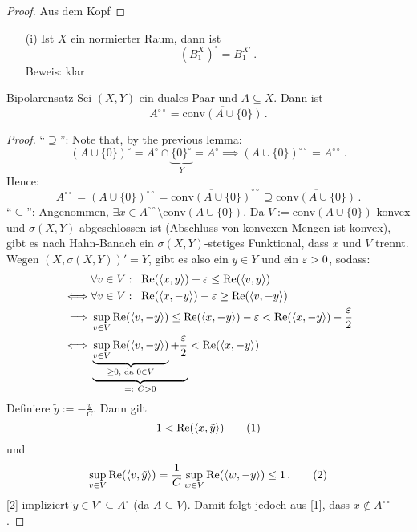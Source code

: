 \documentclass{article}
\begin{document}
	\begin{proof}
		Aus dem Kopf
	\end{proof}
	
		\begin{Beispiel}{}{}
		\begin{itemize}
			\item[(i)] Ist $X$ ein normierter Raum, dann ist
			\[(B_1^X)^{\circ}=B_1^{X'}\,.\]
			Beweis: klar
		\end{itemize}
	\end{Beispiel}
	
	
	
	\begin{Satz}{Bipolarensatz}{}
		Sei $(X,Y)$ ein duales Paar und $A\subseteq X$. Dann ist 
		\[A^{\circ\circ}=\overline{\mathrm{conv}(A\cup \{0\})}\,.\]
	\end{Satz}
	
	\begin{proof}
		\enquote{$\supseteq$}: Note that, by the previous lemma:
		\[(A\cup\{0\})^{\circ}=A^{\circ}\cap\underbrace{\{0\}^{\circ}}_{Y}=A^{\circ}\implies (A\cup\{0\})^{\circ\circ}=A^{\circ\circ}\,.\]
		Hence:
		\[A^{\circ\circ}=(A\cup \{0\})^{\circ\circ}=\overline{\mathrm{conv}(A\cup \{0\})}^{\circ\circ}\supseteq \overline{\mathrm{conv}(A\cup \{0\})}\,.\]
		\enquote{$\subseteq$}: Angenommen, $\exists x\in A^{\circ\circ}\setminus\overline{\mathrm{conv}(A\cup \{0\})}$. Da $V:=\overline{\mathrm{conv}(A\cup \{0\})}$ konvex und $\sigma(X,Y)$-abgeschlossen ist (Abschluss von konvexen Mengen ist konvex), gibt es nach Hahn-Banach ein $\sigma(X,Y)$-stetiges Funktional, dass $x$ und $V$ trennt. Wegen $(X,\sigma(X,Y))'=Y$, gibt es also ein $y\in Y$ und ein $\operatorname{\varepsilon}>0$, sodass:
         \begin{align*}
         &\forall v\in V:\;\; \operatorname{\textrm{Re}}(\left\langle x,y\right\rangle)+\operatorname{\varepsilon}\le \operatorname{\textrm{Re}}(\left\langle v,y\right\rangle)\\
         \iff& \forall v\in V:\;\;\operatorname{\textrm{Re}}(\left\langle x,-y\right\rangle)-\operatorname{\varepsilon}\ge \operatorname{\textrm{Re}}(\left\langle v,-y\right\rangle)\\
         \implies& \sup_{v\in V}\operatorname{\textrm{Re}}(\left\langle v,-y\right\rangle)\le \operatorname{\textrm{Re}}(\left\langle x,-y\right\rangle)-\operatorname{\varepsilon}<\operatorname{\textrm{Re}}(\left\langle x,-y\right\rangle)-\frac{\operatorname{\varepsilon}}{2} \\
         \iff& \underbrace{\underbrace{\sup_{v\in V}\operatorname{\textrm{Re}}(\left\langle v,-y\right\rangle)}_{\ge 0,\text{ da }0\in V}+\frac{\operatorname{\varepsilon}}{2}}_{=:~C>0}<\operatorname{\textrm{Re}}(\left\langle x,-y\right\rangle)
         \end{align*}
         Definiere $\tilde y:=-\frac{y}{C}$. Dann gilt
         \[1<\operatorname{\textrm{Re}}(\left\langle x,\tilde{y}\right\rangle)\tag{1}\label{1}\]
         und 
         \[\sup_{v\in V} \operatorname{\textrm{Re}}(\left\langle v,\tilde y\right\rangle)= \frac{1}{C}\sup_{w\in V}\operatorname{\textrm{Re}}(\left\langle w,-y\right\rangle)\le 1\,.\tag{2}\label{2}\] 
         \eqref{2} impliziert $\tilde{y}\in V^{\circ}\subseteq A^{\circ}$ (da $A\subseteq V$). Damit folgt jedoch aus \eqref{1}, dass $x\notin A^{\circ\circ}$ \lightning. 
         
	\end{proof}
	
\end{document}
